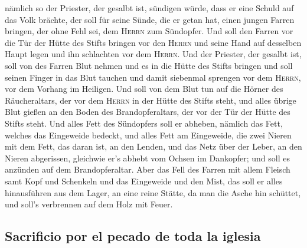 nämlich so der Priester, der gesalbt ist, sündigen würde,
dass er eine Schuld auf das Volk brächte, der soll für seine Sünde, die
er getan hat, einen jungen Farren bringen, der ohne Fehl sei, dem
\textsc{Herrn} zum Sündopfer.  Und soll den Farren vor die
Tür der Hütte des Stifts bringen vor den \textsc{Herrn} und seine Hand
auf desselben Haupt legen und ihn schlachten vor dem \textsc{Herrn}.
 Und der Priester, der gesalbt ist, soll von des Farren
Blut nehmen und es in die Hütte des Stifts bringen  und
soll seinen Finger in das Blut tauchen und damit siebenmal sprengen vor
dem \textsc{Herrn}, vor dem Vorhang im Heiligen.  Und soll
von dem Blut tun auf die Hörner des Räucheraltars, der vor dem
\textsc{Herrn} in der Hütte des Stifts steht, und alles übrige Blut
gießen an den Boden des Brandopferaltars, der vor der Tür der Hütte des
Stifts steht.  Und alles Fett des Sündopfers soll er
abheben, nämlich das Fett, welches das Eingeweide bedeckt, und alles
Fett am Eingeweide,  die zwei Nieren mit dem Fett, das
daran ist, an den Lenden, und das Netz über der Leber, an den Nieren
abgerissen,  gleichwie er's abhebt vom Ochsen im
Dankopfer; und soll es anzünden auf dem Brandopferaltar. 
Aber das Fell des Farren mit allem Fleisch samt Kopf und Schenkeln und
das Eingeweide und den Mist,  das soll er alles
hinausführen aus dem Lager, an eine reine Stätte, da man die Asche hin
schüttet, und soll's verbrennen auf dem Holz mit Feuer.

\hypertarget{sacrificio-por-el-pecado-de-toda-la-iglesia}{%
\subsection{Sacrificio por el pecado de toda la
iglesia}\label{sacrificio-por-el-pecado-de-toda-la-iglesia}}

